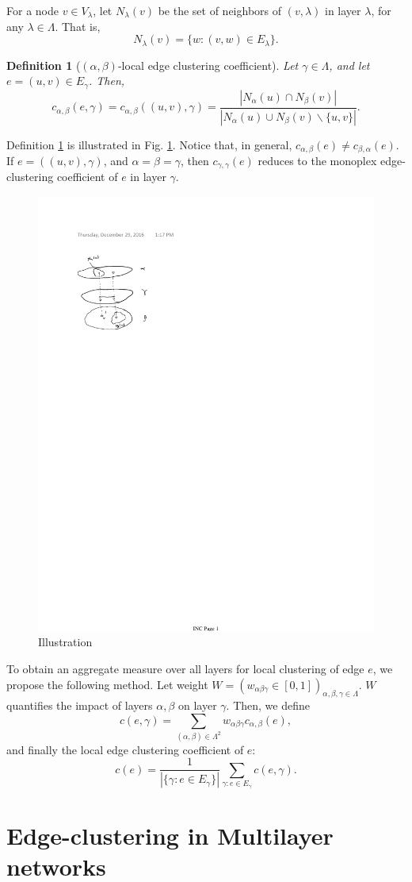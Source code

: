 \documentclass[twocolumn]{IEEEtran}
\newtheorem{definition}{Definition}
\theoremstyle{definition}
\begin{document}
For a node $v \in V_\lambda$,
let $N_\lambda (v)$ be the set of neighbors of $(v, \lambda)$ in layer
$\lambda$, for any $\lambda \in \Lambda$. That is,
\[ N_\lambda (v) = \{ w : (v,w) \in E_{\lambda} \}. \]
\begin{definition}[$(\alpha, \beta )$-local edge clustering coefficient] \label{def:ablecc}
  Let $\gamma \in \Lambda$, and let $e = (u,v) \in E_\gamma$. Then,
  \[ c_{\alpha,\beta}( e, \gamma ) = c_{\alpha,\beta}( (u,v), \gamma )  = \frac{ \left|N_{\alpha}(u) \cap N_{\beta}(v) \right| }{ \left| N_\alpha(u) \cup N_\beta(v) \backslash \{u, v\} \right|  }. \]
\end{definition}
Definition \ref{def:ablecc} is illustrated in Fig. \ref{fig:ablecc}.
Notice that, in general, $c_{\alpha , \beta } ( e  ) \neq c_{ \beta, \alpha } ( e )$.
If $e = ((u,v), \gamma)$, and $\alpha = \beta = \gamma$, then $c_{\gamma, \gamma} ( e )$
reduces to the monoplex edge-clustering coefficient of $e$ in layer $\gamma$.
\begin{figure}
  \includegraphics[scale=1.0]{fig1}
  \caption{ Illustration } \label{fig:ablecc}
\end{figure}
To obtain an aggregate measure over all layers for local clustering
of edge $e$, we propose the following method. Let
weight $W = \left( w_{\alpha \beta \gamma} \in [0,1] \right)_{\alpha, \beta, \gamma \in \Lambda}$.
$W$ quantifies the impact of layers $\alpha, \beta$ on layer $\gamma$.
Then, we define
\[ c( e, \gamma ) = \sum_{(\alpha, \beta) \in \Lambda^2} w_{\alpha \beta \gamma} c_{\alpha, \beta} ( e ), \]
and finally the local edge clustering coefficient of $e$:
\[ c( e ) = \frac{1}{ \left| \{ \gamma : e \in E_\gamma \} \right| } \sum_{ \gamma : e \in E_\gamma } c( e, \gamma ). \]

\section{Edge-clustering in Multilayer networks}
\end{document}

